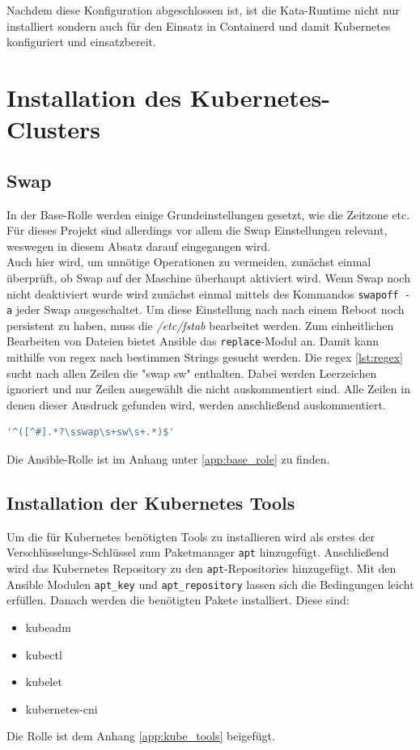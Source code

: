 Nachdem diese Konfiguration abgeschlossen ist, ist die Kata-Runtime nicht nur installiert sondern auch für den Einsatz in Containerd und damit Kubernetes konfiguriert und einsatzbereit.


\section{Installation des Kubernetes-Clusters}

\subsection{Swap}
In der Base-Rolle werden einige Grundeinstellungen gesetzt, wie die Zeitzone etc.
Für dieses Projekt sind allerdings vor allem die Swap Einstellungen relevant, weswegen in diesem Absatz darauf eingegangen wird.
\\
Auch hier wird, um unnötige Operationen zu vermeiden, zunächst einmal überprüft, ob Swap auf der Maschine überhaupt aktiviert wird.
Wenn Swap noch nicht deaktiviert wurde wird zunächst einmal mittels des Kommandos \texttt{swapoff -a} jeder Swap ausgeschaltet.
Um diese Einstellung nach nach einem Reboot noch persistent zu haben, muss die \textit{/etc/fstab} bearbeitet werden.
Zum einheitlichen Bearbeiten von Dateien bietet Ansible das \texttt{replace}-Modul an.
Damit kann mithilfe von \ac{regex} nach bestimmen Strings gesucht werden.
Die \ac{regex} \ref{lst:regex} sucht nach allen Zeilen die "swap sw" enthalten. 
Dabei werden Leerzeichen ignoriert und nur Zeilen ausgewählt die nicht auskommentiert sind. \cite{regex}
Alle Zeilen in denen dieser Ausdruck gefunden wird, werden anschließend auskommentiert.
\begin{lstlisting}[language=bash, caption=regex, label=lst:regex]
'^([^#].*?\sswap\s+sw\s+.*)$'
\end{lstlisting}
Die Ansible-Rolle ist im Anhang unter \ref{app:base_role} zu finden.


\subsection{Installation der Kubernetes Tools}
Um die für Kubernetes benötigten Tools zu installieren wird als erstes der Verschlüsselungs-Schlüssel zum Paketmanager \texttt{apt} hinzugefügt.
Anschließend wird das Kubernetes Repository zu den \texttt{apt}-Repositories hinzugefügt. 
Mit den Ansible Modulen \texttt{apt\_key} und \texttt{apt\_repository} lassen sich die Bedingungen leicht erfüllen.
Danach werden die benötigten Pakete installiert. 
Diese sind:
\begin{itemize}
    \item kubeadm
    \item kubectl
    \item kubelet
    \item kubernetes-cni
\end{itemize}
Die Rolle ist dem Anhang \ref{app:kube_tools} beigefügt.


